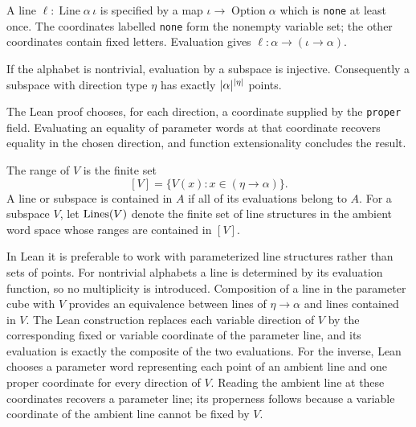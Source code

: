 \begin{definition}
\label{def:line}
\mathlibok
A line $\ell:\operatorname{Line}\alpha\,\iota$ is specified by a map
$\iota\to\operatorname{Option}\alpha$ which is \texttt{none} at least once.  The coordinates
labelled \texttt{none} form the nonempty variable set; the other coordinates contain fixed
letters.  Evaluation gives $\ell:\alpha\to(\iota\to\alpha)$.
\end{definition}

\begin{lemma}
\label{lem:subspace-injective}
If the alphabet is nontrivial, evaluation by a subspace is injective.  Consequently a subspace
with direction type $\eta$ has exactly $\lvert \alpha\rvert^{\lvert \eta\rvert}$ points.
\end{lemma}

The Lean proof chooses, for each direction, a coordinate supplied by the \texttt{proper} field.
Evaluating an equality of parameter words at that coordinate recovers equality in the chosen
direction, and function extensionality concludes the result.

\begin{definition}
\label{def:subspace-range}
The range of $V$ is the finite set
\[
  [V]=\{V(x):x\in(\eta\to\alpha)\}.
\]
A line or subspace is contained in $A$ if all of its evaluations belong to $A$.
For a subspace $V$, let $\operatorname{Lines}(V)$ denote the finite set of line structures in the ambient word
space whose ranges are contained in $[V]$.
\end{definition}

In Lean it is preferable to work with parameterized line structures rather than sets of points.
For nontrivial alphabets a line is determined by its evaluation function, so no multiplicity is
introduced.  Composition of a line in the parameter cube with $V$ provides an equivalence between
lines of $\eta\to\alpha$ and lines contained in $V$.  The Lean construction replaces each variable
direction of $V$ by the corresponding fixed or variable coordinate of the parameter line, and its
evaluation is exactly the composite of the two evaluations.  For the inverse, Lean chooses a
parameter word representing each point of an ambient line and one proper coordinate for every
direction of $V$.  Reading the ambient line at these coordinates recovers a parameter line; its
properness follows because a variable coordinate of the ambient line cannot be fixed by $V$.

